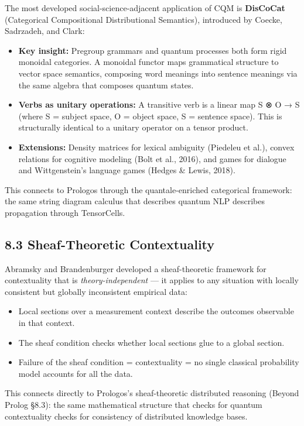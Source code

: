 \documentclass[11pt]{article}
\begin{document}
The most developed social-science-adjacent application of CQM is \textbf{DisCoCat}
(Categorical Compositional Distributional Semantics), introduced by Coecke,
Sadrzadeh, and Clark:

\begin{itemize}
\item \textbf{Key insight:} Pregroup grammars and quantum processes both form rigid monoidal
categories. A monoidal functor maps grammatical structure to vector space
semantics, composing word meanings into sentence meanings via the same algebra
that composes quantum states.
\item \textbf{Verbs as unitary operations:} A transitive verb is a linear map
S ⊗ O → S (where S = subject space, O = object space, S = sentence space).
This is structurally identical to a unitary operator on a tensor product.
\item \textbf{Extensions:} Density matrices for lexical ambiguity (Piedeleu et al.),
convex relations for cognitive modeling (Bolt et al., 2016), and games for
dialogue and Wittgenstein's language games (Hedges \& Lewis, 2018).
\end{itemize}

This connects to Prologos through the quantale-enriched categorical framework:
the same string diagram calculus that describes quantum NLP describes
propagation through TensorCells.
\subsection{8.3 Sheaf-Theoretic Contextuality}
\label{sec:org7f3c0ae}

Abramsky and Brandenburger developed a sheaf-theoretic framework for
contextuality that is \emph{theory-independent} --- it applies to any situation
with locally consistent but globally inconsistent empirical data:

\begin{itemize}
\item Local sections over a measurement context describe the outcomes observable
in that context.
\item The sheaf condition checks whether local sections glue to a global section.
\item Failure of the sheaf condition = contextuality = no single classical
probability model accounts for all the data.
\end{itemize}

This connects directly to Prologos's sheaf-theoretic distributed reasoning
(Beyond Prolog §8.3): the same mathematical structure that checks for
quantum contextuality checks for consistency of distributed knowledge bases.
\end{document}
